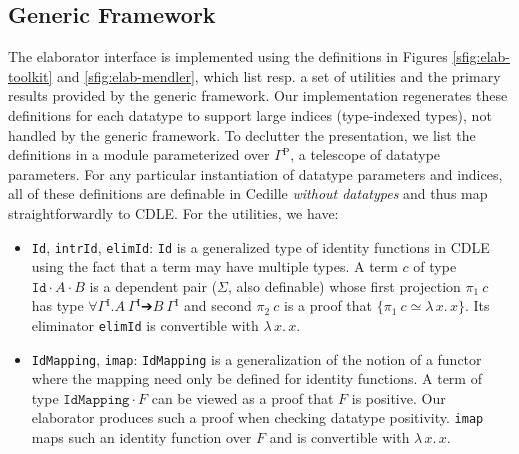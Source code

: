 \documentclass{article}
\newcommand{\abs}[4]{{#1}\, #2\! : \! #3.\, #4}
\newcommand{\absu}[3]{{#1}\, #2.\, #3}
\newcommand{\splab}[1]{\ensuremath{^{\text{#1}}}}
\begin{document}

\subsection{Generic Framework}
The elaborator interface is implemented using the definitions in Figures
\ref{sfig:elab-toolkit} and \ref{sfig:elab-mendler}, which list resp. a set of
utilities and the primary results provided by the generic framework. Our
implementation regenerates these definitions for each datatype to support large
indices (type-indexed types), not handled by the generic framework. To declutter
the presentation, we list the definitions in a module parameterized over
\(\Gamma\splab{P}\), a telescope of datatype parameters. For any particular
instantiation of datatype parameters and indices, all of these definitions
are definable in Cedille \textit{without datatypes} and thus map straightforwardly
to CDLE. For the utilities, we have:
\begin{itemize}
\item \texttt{Id}, \texttt{intrId}, \texttt{elimId}: \texttt{Id} is a generalized type of identity functions in CDLE using the
  fact that a term may have multiple types. A term $c$ of type
  $\texttt{Id} ·A ·B$ is a dependent pair ($\Sigma$, also definable) whose first projection
  $\pi_1\ c$ has type \(∀ \Gamma\splab{I}. A\ \Gamma\splab{I} ➔ B\ \Gamma\splab{I}\) and second $\pi_2\ c$ is a
  proof that \(\{\pi_1\ c ≃ \absu{λ}{x}{x}\}\). Its eliminator \texttt{elimId}
  is convertible with $\absu{λ}{x}{x}$.
\item \texttt{IdMapping}, \texttt{imap}: \texttt{IdMapping} is a generalization
  of the notion of a functor where the mapping 
  need only be defined for identity functions. A term of type $\texttt{IdMapping}
  · F$ can be viewed as a proof that $F$ is positive. Our elaborator
  produces such a proof when checking datatype positivity. \texttt{imap} maps such
  an identity function over $F$ and is convertible with $\absu{λ}{x}{x}$.
\end{itemize}
\end{document}
